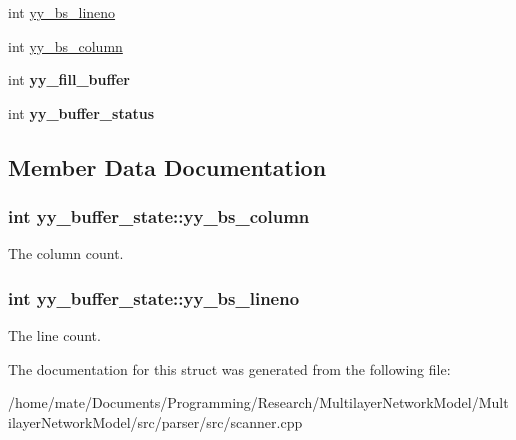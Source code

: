 \begin{DoxyCompactItemize}
\item 
int \hyperlink{structyy__buffer__state_a818e94bc9c766e683c60df1e9fd01199}{yy\+\_\+bs\+\_\+lineno}
\item 
int \hyperlink{structyy__buffer__state_a10c4fcd8be759e6bf11e6d3e8cdb0307}{yy\+\_\+bs\+\_\+column}
\item 
int {\bfseries yy\+\_\+fill\+\_\+buffer}\hypertarget{structyy__buffer__state_a63d2afbb1d79a3fc63df9e12626f827d}{}\label{structyy__buffer__state_a63d2afbb1d79a3fc63df9e12626f827d}

\item 
int {\bfseries yy\+\_\+buffer\+\_\+status}\hypertarget{structyy__buffer__state_a70fd925d37a2f0454fbd0def675d106c}{}\label{structyy__buffer__state_a70fd925d37a2f0454fbd0def675d106c}

\end{DoxyCompactItemize}


\subsection{Member Data Documentation}
\subsubsection[{\texorpdfstring{yy\+\_\+bs\+\_\+column}{yy_bs_column}}]{\setlength{\rightskip}{0pt plus 5cm}int yy\+\_\+buffer\+\_\+state\+::yy\+\_\+bs\+\_\+column}\hypertarget{structyy__buffer__state_a10c4fcd8be759e6bf11e6d3e8cdb0307}{}\label{structyy__buffer__state_a10c4fcd8be759e6bf11e6d3e8cdb0307}
The column count. 
\subsubsection[{\texorpdfstring{yy\+\_\+bs\+\_\+lineno}{yy_bs_lineno}}]{\setlength{\rightskip}{0pt plus 5cm}int yy\+\_\+buffer\+\_\+state\+::yy\+\_\+bs\+\_\+lineno}\hypertarget{structyy__buffer__state_a818e94bc9c766e683c60df1e9fd01199}{}\label{structyy__buffer__state_a818e94bc9c766e683c60df1e9fd01199}
The line count. 

The documentation for this struct was generated from the following file\+:\begin{DoxyCompactItemize}
\item 
/home/mate/\+Documents/\+Programming/\+Research/\+Multilayer\+Network\+Model/\+Multilayer\+Network\+Model/src/parser/src/scanner.\+cpp\end{DoxyCompactItemize}
